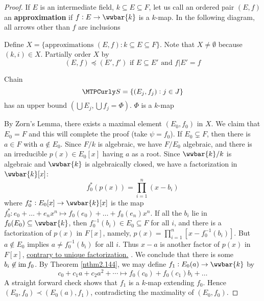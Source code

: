 \documentclass[11pt]{article}
\begin{document}
\begin{proof}
If \(E\) is an intermediate field, \(k\subseteq E\subseteq F\), let us call an
ordered pair \((E,f)\) an \textbf{approximation} if \(f:E\to\wwbar{k}\) is a \(k\)-map.
In the following diagram, all arrows other than \(f\) are inclusions


\begin{center}
\end{center}

Define \(X=\{\text{approximations }(E,f):k\subseteq E\subseteq F\}\). Note that
\(X\neq\emptyset\) because \((k,i)\in X\). Partially order \(X\) by
\begin{equation*}
(E,f)\preceq(E',f')\text{ if }E\subseteq E'\text{ and }f|E'=f
\end{equation*}

Chain
\begin{equation*}
\cals=\{(E_j,f_j):j\in J\}
\end{equation*}
has an upper bound \((\bigcup E_j,\bigcup f_j=\Phi)\). \(\Phi\) is a \(k\)-map

By Zorn's Lemma, there exists a maximal element \((E_0,f_0)\) in \(X\). We
claim that \(E_0=F\) and this will complete the proof (take \(\psi=f_0\)).
If \(E_0\subsetneq F\), then there is \(a\in F\) with \(a\not\in E_0\). Since
\(F/k\) is algebraic, we have \(F/E_0\) algebraic, and there is an
irreducible \(p(x)\in E_0[x]\) having \(a\) as a root. Since \(\wwbar{k}/k\) is
algebraic and \(\wwbar{k}\) is algebraically closed, we have a factorization
in \(\wwbar{k}[x]\):
\begin{equation*}
f_0^*(p(x))=\displaystyle\prod_{i=1}^n(x-b_i)
\end{equation*}
where \(f_0^*:E_0[x]\to\wwbar{k}[x]\) is the map 
\(f_0^*:e_0+\dots+e_nx^n\mapsto f_0(e_0)+\dots+f_0(e_n)x^n\). If all the
\(b_i\) lie in \(f_0(E_0)\subseteq\wwbar{k}\), then 
\(f_0^{-1}(b_i)\in E_0\subseteq F\) for all \(i\), and there is a factorization
of \(p(x)\) in \(F[x]\), namely, \(p(x)=\prod_{i=1}^n[x-f_0^{-1}(b_i)]\). But
\(a\not\in E_0\) implies \(a\neq f_0^{-1}(b_i)\) for all \(i\). Thus \(x-a\) is
another factor of \(p(x)\) in \(F[x]\), \uline{contrary to unique factorization.}
. We conclude that there is some \(b_i\not\in\operatorname{im} f_0\). By Theorem
\ref{nthm2.144}, we may define \(f_1:E_0(a)\to\wwbar{k}\) by 
\begin{equation*}
 c_0+c_1a+c_2a^2+\cdots\mapsto f_0(c_0)+f_0(c_1)b_i+\dots
\end{equation*}
A straight forward check shows that \(f_1\) is a \(k\)-map extending \(f_0\).
Hence \((E_0,f_0)\prec(E_0(a),f_1)\), contradicting the maximality of \((E_0,f_0)\).
\end{proof}
\end{document}
